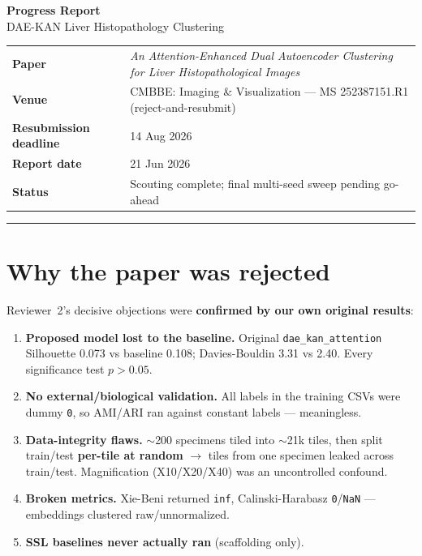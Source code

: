 \documentclass[11pt,a4paper]{article}
\begin{document}
\begin{center}
{\LARGE\bfseries Progress Report}\\[4pt]
{\large DAE-KAN Liver Histopathology Clustering}\\[10pt]
\end{center}

\noindent
\begin{tabular}{@{}ll@{}}
\textbf{Paper} & \emph{An Attention-Enhanced Dual Autoencoder Clustering for Liver Histopathological Images} \\
\textbf{Venue} & CMBBE: Imaging \& Visualization --- MS 252387151.R1 (reject-and-resubmit) \\
\textbf{Resubmission deadline} & 14 Aug 2026 \\
\textbf{Report date} & 21 Jun 2026 \\
\textbf{Status} & Scouting complete; final multi-seed sweep pending go-ahead \\
\end{tabular}

\vspace{6pt}\hrule\vspace{8pt}

\section{Why the paper was rejected}
Reviewer~2's decisive objections were \textbf{confirmed by our own original results}:
\begin{enumerate}[label=\arabic*.]
\item \textbf{Proposed model lost to the baseline.} Original \texttt{dae\_kan\_attention} Silhouette 0.073 vs baseline 0.108; Davies-Bouldin 3.31 vs 2.40. Every significance test $p>0.05$.
\item \textbf{No external/biological validation.} All labels in the training CSVs were dummy \texttt{0}, so AMI/ARI ran against constant labels --- meaningless.
\item \textbf{Data-integrity flaws.} $\sim$200 specimens tiled into $\sim$21k tiles, then split train/test \textbf{per-tile at random} $\rightarrow$ tiles from one specimen leaked across train/test. Magnification (X10/X20/X40) was an uncontrolled confound.
\item \textbf{Broken metrics.} Xie-Beni returned \texttt{inf}, Calinski-Harabasz \texttt{0}/\texttt{NaN} --- embeddings clustered raw/unnormalized.
\item \textbf{SSL baselines never actually ran} (scaffolding only).
\end{enumerate}
\end{document}
